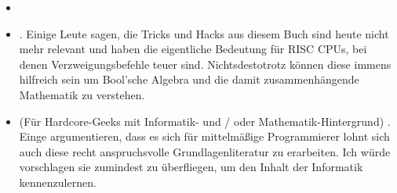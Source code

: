 \begin{itemize}

	\item \RobPikePractice
	
	\item \HenryWarren.
	Einige Leute sagen, die Tricks und Hacks aus diesem Buch sind heute nicht mehr relevant und haben die eigentliche Bedeutung für \ac{RISC} \ac{CPU}s, bei denen Verzweigungsbefehle teuer sind.
	Nichtsdestotrotz können diese immens hilfreich sein um Bool'sche Algebra und die damit zusammenhängende Mathematik zu verstehen.
	
	\item (Für Hardcore-Geeks mit Informatik- und / oder Mathematik-Hintergrund) \TAOCP.
	Einge argumentieren, dass es sich für mittelmäßige Programmierer lohnt sich auch diese recht anspruchsvolle Grundlagenliteratur zu erarbeiten.
	Ich würde vorschlagen sie zumindest zu überfliegen, um den Inhalt der Informatik kennenzulernen.
	
\end{itemize}


